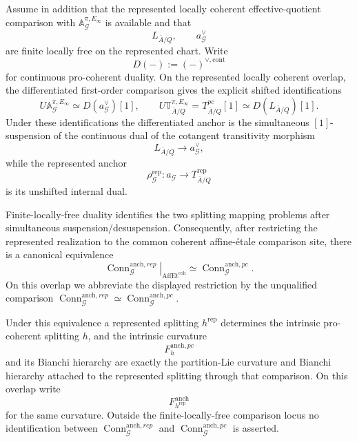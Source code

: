 \begin{proposition}
\label{prop:symmetry-noether-represented-finite-locally-free-comparison-of-anchor-splittings-and-curvature}
Assume in addition that the represented locally coherent effective-quotient
comparison with
$\mathbb A_{\mathcal G}^{\pi,E_\infty}$ is available and that
\[
L_{\overline A/Q},
\qquad
a_{\mathcal G}^{\vee}
\]
are finite locally free on the represented chart.  Write
\[
D(-):=(-)^{\vee,\mathrm{cont}}
\]
for continuous pro-coherent duality.  On the represented locally coherent overlap,
the differentiated first-order comparison gives the explicit shifted
identifications
\[
\boxed{
U\mathbb A_{\mathcal G}^{\pi,E_\infty}
\simeq
D(a_{\mathcal G}^{\vee})[1],
\qquad
U\mathbb T_{\overline A/Q}^{\pi,E_\infty}
=
T_{\overline A/Q}^{pc}[1]
\simeq
D(L_{\overline A/Q})[1].
}
\]
Under these identifications the differentiated anchor is the simultaneous
$[1]$-suspension of the continuous dual of the cotangent transitivity morphism
\[
L_{\overline A/Q}
\longrightarrow
a_{\mathcal G}^{\vee},
\]
while the represented anchor
\[
\rho_{\mathcal G}^{\mathrm{rep}}:
a_{\mathcal G}\longrightarrow T_{\overline A/Q}^{\mathrm{rep}}
\]
is its unshifted internal dual.

Finite-locally-free duality identifies the two splitting mapping problems after
simultaneous suspension/desuspension.  Consequently, after restricting the
represented realization to the common coherent affine-\'etale comparison site,
there is a canonical equivalence
\[
\boxed{
\left.
\operatorname{Conn}^{\mathrm{anch},rep}_{\mathcal G}
\right|_{\operatorname{AffEt}^{\mathrm{coh}}}
\simeq
\operatorname{Conn}^{\mathrm{anch},pc}_{\mathcal G}.
}
\]
On this overlap we abbreviate the displayed restriction by the unqualified
comparison
$\operatorname{Conn}^{\mathrm{anch},rep}_{\mathcal G}
\simeq
\operatorname{Conn}^{\mathrm{anch},pc}_{\mathcal G}$.

Under this equivalence a represented splitting $h^{\mathrm{rep}}$ determines the
intrinsic pro-coherent splitting $h$, and the intrinsic curvature
\[
F_h^{\mathrm{anch},pc}
\]
and its Bianchi hierarchy are exactly the partition-Lie curvature and Bianchi
hierarchy attached to the represented splitting through that comparison.  On this
overlap write
\[
F_{h^{\mathrm{rep}}}^{\mathrm{anch}}
\]
for the same curvature.  Outside the finite-locally-free comparison locus no
identification between
$\operatorname{Conn}^{\mathrm{anch},rep}_{\mathcal G}$ and
$\operatorname{Conn}^{\mathrm{anch},pc}_{\mathcal G}$ is asserted.
\end{proposition}

